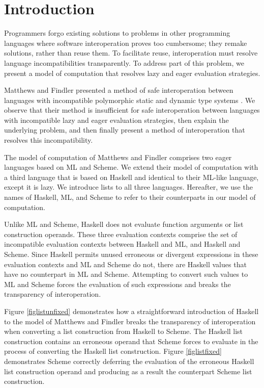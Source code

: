 \chapter{Introduction}

Programmers forgo existing solutions to problems in other programming languages where software interoperation proves too cumbersome; they remake solutions, rather than reuse them. To facilitate reuse, interoperation must resolve language incompatibilities transparently. To address part of this problem, we present a model of computation that resolves lazy and eager evaluation strategies.

Matthews and Findler presented a method of safe interoperation between languages with incompatible polymorphic static and dynamic type systems \cite{matthews07}. We observe that their method is insufficient for safe interoperation between languages with incompatible lazy and eager evaluation strategies, then explain the underlying problem, and then finally present a method of interoperation that resolves this incompatibility.

The model of computation of Matthews and Findler comprises two eager languages based on ML and Scheme. We extend their model of computation with a third language that is based on Haskell and identical to their ML-like language, except it is lazy. We introduce lists to all three languages. Hereafter, we use the names of Haskell, ML, and Scheme to refer to their counterparts in our model of computation.

Unlike ML and Scheme, Haskell does not evaluate function arguments or list construction operands. These three evaluation contexts comprise the set of incompatible evaluation contexts between Haskell and ML, and Haskell and Scheme. Since Haskell permits unused erroneous or divergent expressions in these evaluation contexts and ML and Scheme do not, there are Haskell values that have no counterpart in ML and Scheme. Attempting to convert such values to ML and Scheme forces the evaluation of such expressions and breaks the transparency of interoperation.





Figure \ref{figlistunfixed} demonstrates how a straightforward introduction of Haskell to the model of Matthews and Findler breaks the transparency of interoperation when converting a list construction from Haskell to Scheme. The Haskell list construction contains an erroneous operand that Scheme forces to evaluate in the process of converting the Haskell list construction. Figure \ref{figlistfixed} demonstrates Scheme correctly deferring the evaluation of the erroneous Haskell list construction operand and producing as a result the counterpart Scheme list construction.

